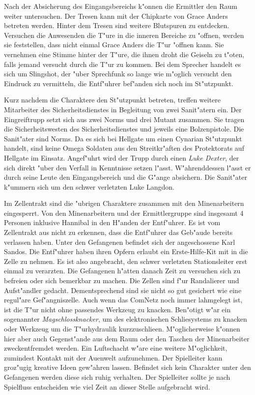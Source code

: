 
Nach der Absicherung des Eingangsbereichs k"onnen die Ermittler den Raum weiter untersuchen. Der Tresen kann mit der Chipkarte von Grace Anders betreten werden. Hinter dem Tresen sind weitere Blutspuren zu entdecken. Versuchen die Anwesenden die T"ure in die inneren Bereiche zu "offnen, werden sie feststellen, dass nicht einmal Grace Anders die T"ur "offnen kann. Sie vernehmen eine Stimme hinter der T"ure, die ihnen droht die Geiseln zu t"oten, falls jemand versucht durch die T"ur zu kommen. Bei dem Sprecher handelt es sich um Slingshot, der "uber Sprechfunk so lange wie m"oglich versucht den Eindruck zu vermitteln, die Entf"uhrer bef"anden sich noch im St"utzpunkt. 

Kurz nachdem die Charaktere den St"utzpunkt betreten, treffen weitere Mitarbeiter des Sicherheitsdienstes in Begleitung von zwei Sanit"atern ein. Der Eingreiftrupp setzt sich aus zwei Norms und drei Mutant zusammen. Sie tragen die Sicherheitswesten des Sicherheitsdienstes und jeweils eine Bolzenpistole. Die Sanit"ater sind Norms. Da es sich bei Hellgate um einen Cynarian St"utzpunkt handelt, sind keine Omega Soldaten aus den Streitkr"aften des Protektorats auf Hellgate im Einsatz. Angef"uhrt wird der Trupp durch einen \emph{Luke Dexter}, der sich direkt "uber den Verfall in Kenntnisse setzen l"asst. W"ahrenddessen l"asst er durch seine Leute den Eingangsbereich und die G"ange absichern. Die Sanit"ater k"ummern sich um den schwer verletzten Luke Langdon.


Im Zellentrakt sind die "ubrigen Charaktere zusammen mit den Minenarbeitern eingesperrt. Von den Minenarbeitern und der Ermittlergruppe sind insgesamt 4 Personen inklusive Hannibal in den H"anden der Entf"uhrer. Es ist vom Zellentrakt aus nicht zu erkennen, dass die Entf"uhrer das Geb"aude bereits verlassen haben. Unter den Gefangenen befindet sich der angeschossene Karl Sandos. Die Entf"uhrer haben ihren Opfern erlaubt ein Erste-Hilfe-Kit mit in die Zelle zu nehmen. Es ist also angebracht, den schwer verletzten Stationsleiter erst einmal zu verarzten. Die Gefangenen h"atten danach Zeit zu versuchen sich zu befreien oder sich bemerkbar zu machen. Die Zellen sind f"ur Randalierer und Aufst"andler gedacht. Dementsprechend sind sie nicht so gut gesichert wie eine regul"are Gef"angniszelle. Auch wenn das ComNetz noch immer lahmgelegt ist, ist die T"ur nicht ohne passendes Werkzeug zu knacken. Ben"otigt w"ar ein sogenannter \emph{Magschlossknacker}, um des elektronischen Schlie\3systems zu knacken oder Werkzeug um die T"urhydraulik kurzzuschlie\3en. M"oglicherweise k"onnen hier aber auch Gegenst"ande aus dem Raum oder den Taschen der Minenarbeiter zweckentfremdet werden. Ein Luftschacht w"are eine weitere M"oglichkeit, zumindest Kontakt mit der Au\3enwelt aufzunehmen. Der Spielleiter kann gro\3z"ugig kreative Ideen gew"ahren lassen. Befindet sich kein Charakter unter den Gefangenen werden diese sich ruhig verhalten. Der Spielleiter sollte je nach Spielfluss entscheiden wie viel Zeit an dieser Stelle aufgebracht wird. 

